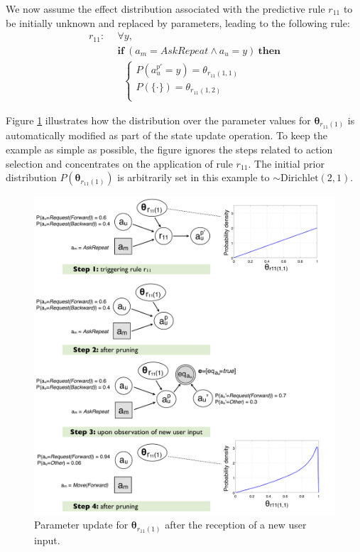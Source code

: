 We now assume the effect distribution associated with the predictive rule $r_{11}$ to be initially unknown and replaced by parameters, leading to the following rule:
\begin{align*}
r_{11}: \ \ & \forall y, \\ 
& \textbf{if} \ (a_m = \mathit{AskRepeat} \land a_u=y) \ \textbf{then} \\ 
& \; \;  \begin{cases} 
P(a_{u}^{p\prime} = y) = \theta_{r_{11}(1,1)} \\ 
P(\{\cdot\}) = \theta_{r_{11}(1,2)} \\ 
\end{cases}
\end{align*}

Figure \ref{fig:learningexample} illustrates how the distribution over the parameter values for $\boldsymbol\theta_{r_{11}(1)}$ is automatically modified as part of the state update operation. To keep the example as simple as possible, the figure ignores the steps related to action selection and concentrates on the application of rule $r_{11}$.  The initial prior distribution $P(\boldsymbol\theta_{r_{11}(1)})$ is arbitrarily set in this example to $\sim \mathrm{Dirichlet}(2,1)$.

\begin{figure}[h!] \vspace{0mm}
\centering
\includegraphics[scale=0.29]{imgs/learningexample.pdf}
\caption{Parameter update for $\boldsymbol\theta_{r_{11}(1)}$ after the reception of a new user input. }
\label{fig:learningexample}
\end{figure}

